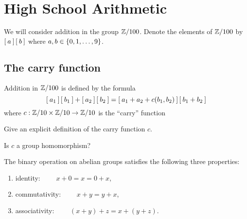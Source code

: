 \section{High School Arithmetic}
We will consider addition in the group $\mathbb{Z}/100$. Denote the elements of $\mathbb{Z}/100$ by $\left[\: a \:\right]\left[\: b \:\right]$ where $a,b \in \left\{0, 1, \dots, 9\right\}$.

\subsection{The carry function}
\begin{mdframed}
\end{mdframed}


Addition in $\mathbb{Z}/100$ is defined by the formula
\begin{equation}
  \label{equation:additionFormula}
  \left[\: a_1 \:\right]\left[\: b_1 \:\right] + \left[\: a_2 \:\right]\left[\: b_2 \:\right]
  =
  \left[\: a_1 + a_2 + c(b_1, b_2) \:\right]\left[\: b_1 + b_2 \:\right]
\end{equation}
where $c: \mathbb{Z}/10 \times \mathbb{Z}/10 \rightarrow \mathbb{Z}/10$ is the ``carry'' function

\begin{qbox}
  Give an explicit definition of the carry function $c$.
\end{qbox}

\begin{qbox}
  Is $c$ a group homomorphism?
\end{qbox}

The binary operation on abelian groups satisfies the following three properties:
\begin{enumerate}
  \item identity: $\qquad x + 0 = x = 0 + x$,
  \item commutativity: $\qquad x+y = y+x$,
  \item associativity: $\qquad (x+y)+z = x + (y+z)$.
\end{enumerate}

